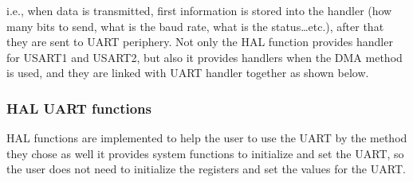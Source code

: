 i.e., when data is transmitted, first information is stored into the handler (how many bits to send, what is the baud rate, what is the status…etc.), after that they are sent to UART periphery. Not only the HAL function provides handler for USART1 and USART2, but also it provides handlers when the DMA method is used, and they are linked with UART handler together as shown below.\\

\subsubsection{HAL UART functions}

HAL functions are implemented to help the user to use the UART by the method they chose as well it provides system functions to initialize and set the UART, so the user does not need to initialize the registers and set the values for the UART.



